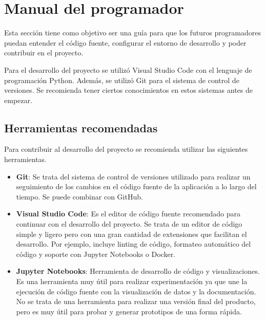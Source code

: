\section{Manual del programador}

Esta sección tiene como objetivo ser una guía para que los futuros programadores puedan entender el código fuente, configurar el entorno de desarrollo y poder contribuir en el proyecto.

Para el desarrollo del proyecto se utilizó Visual Studio Code con el lenguaje de programación Python. Además, se utilizó Git para el sistema de control de versiones. Se recomienda tener ciertos conocimientos en estos sistemas antes de empezar.

\subsection{Herramientas recomendadas}

Para contribuir al desarrollo del proyecto se recomienda utilizar las siguientes herramientas.

\begin{itemize}
\tightlist

\item \textbf{Git}: Se trata del sistema de control de versiones utilizado para realizar un seguimiento de los cambios en el código fuente de la aplicación a lo largo del tiempo. Se puede combinar con GitHub. \cite{Git} \cite{GitHub}


\item \textbf{Visual Studio Code}: Es el editor de código fuente recomendado para continuar con el desarrollo del proyecto. Se trata de un editor de código simple y ligero pero con una gran cantidad de extensiones que facilitan el desarrollo.
Por ejemplo, incluye linting de código, formateo automático del código y soporte con Jupyter Notebooks o Docker. \cite{Microsoft_2021}


\item \textbf{Jupyter Notebooks}: Herramienta de desarrollo de código y visualizaciones. Es una herramienta muy útil para realizar experimentación ya que une la ejecución de código fuente con la visualización de datos y la documentación.
No se trata de una herramienta para realizar una versión final del producto, pero es muy útil para probar y generar prototipos de una forma rápida. \cite{Jupyter}


\end{itemize}

